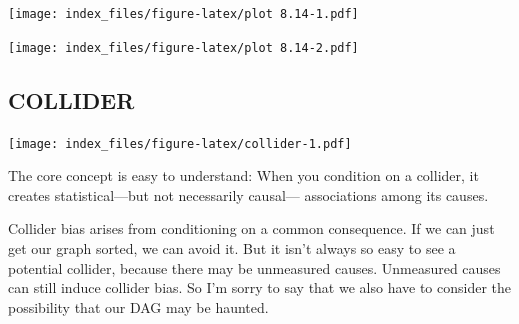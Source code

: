 \documentclass[
]{article}
\newenvironment{Shaded}{\begin{snugshade}}{\end{snugshade}}
\newcommand{\CommentTok}[1]{\textcolor[rgb]{0.56,0.35,0.01}{\textit{#1}}}
\newcommand{\DataTypeTok}[1]{\textcolor[rgb]{0.13,0.29,0.53}{#1}}
\newcommand{\DecValTok}[1]{\textcolor[rgb]{0.00,0.00,0.81}{#1}}
\newcommand{\FloatTok}[1]{\textcolor[rgb]{0.00,0.00,0.81}{#1}}
\newcommand{\KeywordTok}[1]{\textcolor[rgb]{0.13,0.29,0.53}{\textbf{#1}}}
\newcommand{\NormalTok}[1]{#1}
\newcommand{\OperatorTok}[1]{\textcolor[rgb]{0.81,0.36,0.00}{\textbf{#1}}}
\newcommand{\StringTok}[1]{\textcolor[rgb]{0.31,0.60,0.02}{#1}}
\begin{document}
\texttt{[image: index\_files/figure-latex/plot 8.14-1.pdf]}

\begin{Shaded}
\end{Shaded}

\texttt{[image: index\_files/figure-latex/plot 8.14-2.pdf]}

\hypertarget{collider}{%
\subsection{COLLIDER}\label{collider}}

\texttt{[image: index\_files/figure-latex/collider-1.pdf]}

The core concept is easy to understand: When you condition on a
collider, it creates statistical---but not necessarily causal---
associations among its causes.

Collider bias arises from conditioning on a common consequence. If we
can just get our graph sorted, we can avoid it. But it isn't always so
easy to see a potential collider, because there may be unmeasured
causes. Unmeasured causes can still induce collider bias. So I'm sorry
to say that we also have to consider the possibility that our DAG may be
haunted.
\end{document}
